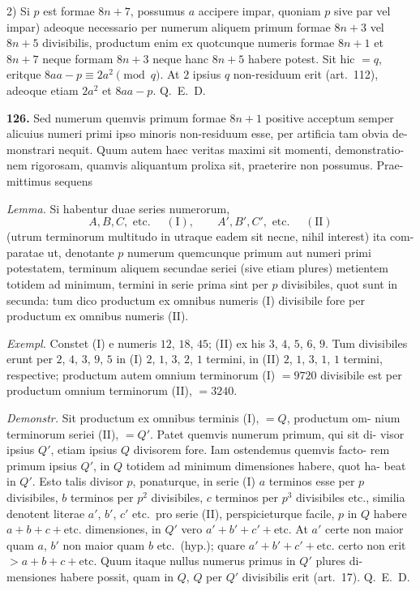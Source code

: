 \documentclass[12pt,a4paper]{article}
\begin{document}
2) Si $p$ est formae $8n+7$, possumus $a$ accipere impar, quoniam $p$ sive
par vel impar) adeoque necessario per numerum aliquem primum formae $8n+3$
vel $8n+5$ divisibilis, productum enim ex quotcunque numeris formae $8n+1$
et $8n+7$ neque formam $8n+3$ neque hanc $8n+5$ habere potest. Sit hic
$= q$, eritque $8aa - p \equiv 2a^2 \pmod{q}$. At $2$ ipsius $q$ non-residuum erit (art.~112),
adeoque etiam $2a^2$ et $8aa - p$. Q.~E.~D.

\textbf{126.}
Sed numerum quemvis primum formae $8n+1$ positive acceptum semper
alicuius numeri primi ipso minoris non-residuum esse, per artificia tam obvia de-
monstrari nequit. Quum autem haec veritas maximi sit momenti, demonstratio-
nem rigorosam, quamvis aliquantum prolixa sit, praeterire non possumus. Prae-
mittimus sequens

\textit{Lemma.} Si habentur duae series numerorum,
\[
A, B, C, \text{ etc. } \quad (\text{I}), \qquad A', B', C', \text{ etc. } \quad (\text{II})
\]
(utrum terminorum multitudo in utraque eadem sit necne, nihil interest) ita com-
paratae ut, denotante $p$ numerum quemcunque primum aut numeri primi potestatem,
terminum aliquem secundae seriei (sive etiam plures) metientem totidem ad minimum,
termini in serie prima sint per $p$ divisibiles, quot sunt in secunda: tum dico productum
ex omnibus numeris (I) divisibile fore per productum ex omnibus numeris (II).

\textit{Exempl.} Constet (I) e numeris $12$, $18$, $45$; (II) ex his $3$, $4$, $5$, $6$, $9$. Tum
divisibiles erunt per $2$, $4$, $3$, $9$, $5$ in (I) $2$, $1$, $3$, $2$, $1$ termini, in (II) $2$, $1$, $3$, $1$, $1$
termini, respective; productum autem omnium terminorum (I) $= 9720$ divisibile
est per productum omnium terminorum (II), $= 3240$.

\textit{Demonstr.} Sit productum ex omnibus terminis (I), $= Q$, productum om-
nium terminorum seriei (II), $= Q'$. Patet quemvis numerum primum, qui sit di-
visor ipsius $Q'$, etiam ipsius $Q$ divisorem fore. Iam ostendemus quemvis facto-
rem primum ipsius $Q'$, in $Q$ totidem ad minimum dimensiones habere, quot ha-
beat in $Q'$. Esto talis divisor $p$, ponaturque, in serie (I) $a$ terminos esse per $p$
divisibiles, $b$ terminos per $p^2$ divisibiles, $c$ terminos per $p^3$ divisibiles etc., similia
denotent literae $a'$, $b'$, $c'$ etc.\ pro serie (II), perspicieturque facile, $p$ in $Q$ habere
$a+b+c+\text{etc.}$ dimensiones, in $Q'$ vero $a'+b'+c'+\text{etc.}$ At $a'$ certe non
maior quam $a$, $b'$ non maior quam $b$ etc.\ (hyp.); quare $a'+b'+c'+\text{etc.}$ certo non
erit $> a+b+c+\text{etc.}$ Quum itaque nullus numerus primus in $Q'$ plures di-
mensiones habere possit, quam in $Q$, $Q$ per $Q'$ divisibilis erit (art.~17). Q.~E.~D.
\end{document}
